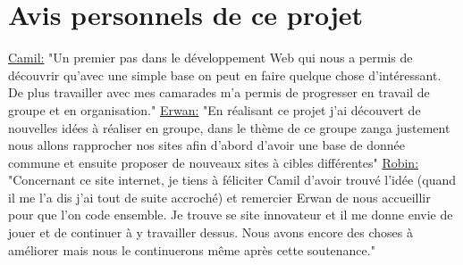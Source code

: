 \documentclass[a4paper, 11pt]{article}
\begin{document}
\section{Avis personnels de ce projet}
\underline{Camil:} "Un premier pas dans le développement Web qui nous a permis de découvrir qu'avec une simple base on peut en faire quelque chose d'intéressant. De plus travailler avec mes camarades m'a permis de progresser en travail de groupe et en organisation."
\newline
\underline{Erwan:} "En réalisant ce projet j'ai découvert de nouvelles idées à réaliser en groupe, dans le thème de ce groupe zanga justement nous allons rapprocher nos sites afin d'abord d'avoir une base de donnée commune et ensuite proposer de nouveaux sites à cibles différentes"
\newline
\underline{Robin:} "Concernant ce site internet, je tiens à féliciter Camil d'avoir trouvé l'idée (quand il me l'a dis j'ai tout de suite accroché) et remercier Erwan de nous accueillir pour que l'on code ensemble. Je trouve se site innovateur et il me donne envie de jouer et de continuer à y travailler dessus. Nous avons encore des choses à améliorer mais nous le continuerons même après cette soutenance."
\end{document}
